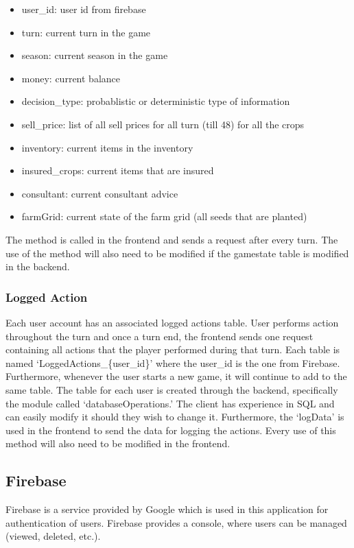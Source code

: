 \documentclass{article}
\begin{document}
\begin{itemize}
    \item user\_id: user id from firebase
    \item turn: current turn in the game
    \item season: current season in the game
    \item money: current balance
    \item decision\_type: probablistic or deterministic type of information
    \item sell\_price: list of all sell prices for all turn (till 48) for all the crops
    \item inventory: current items in the inventory
    \item insured\_crops: current items that are insured
    \item consultant: current consultant advice
    \item farmGrid: current state of the farm grid (all seeds that are planted)
\end{itemize}
The method is called in the frontend and sends a request after every turn. The use of the method will also need to be modified if the gamestate table is modified in the backend.


\subsubsection{Logged Action}
Each user account has an associated logged actions table. User performs action throughout the turn and once a turn end, the frontend sends one request containing all actions that the player performed during that turn. Each table is named `LoggedActions\_\{user\_id\}' where the user\_id is the one from Firebase. Furthermore, whenever the user starts a new game, it will continue to add to the same table. The table for each user is created through the backend, specifically the module called `databaseOperations.' The client has experience in SQL and can easily modify it should they wish to change it. Furthermore, the `logData' is used in the frontend to send the data for logging the actions. Every use of this method will also need to be modified in the frontend.


\subsection{Firebase}
Firebase is a service provided by Google which is used in this application for authentication of users. Firebase provides a console, where users can be managed (viewed, deleted, etc.). \\
\end{document}
